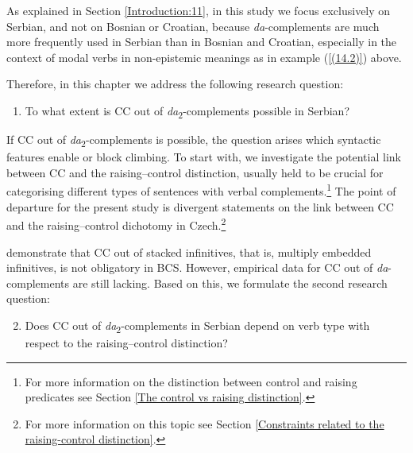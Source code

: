 As explained in Section \ref{Introduction:11}, in this study we focus exclusively on Serbian, and not on Bosnian or Croatian, because \textit{da}-complements are much more frequently used in Serbian than in Bosnian and Croatian, especially in the context of modal verbs in non-epistemic meanings as in example (\ref{(14.2)}) above.

Therefore, in this chapter we address the following research question: 

\begin{enumerate}[label=Q\arabic*:]
\item To what extent is CC out of \textit{da}\textsubscript{2}-complements possible in Serbian?
\end{enumerate}

If CC out of \textit{da}\textsubscript{2}-complements is possible, the question arises which syntactic features enable or block climbing. To start with, we investigate the potential link between CC and the raising--control distinction, usually held to be crucial for categorising different types of sentences with verbal complements.\footnote{For more information on the distinction between control and raising predicates see Section \ref{The control vs raising distinction}.} The point of departure for the present study is divergent statements on the link between CC and the raising--control dichotomy in Czech.\footnote{For more information on this topic see Section \ref{Constraints related to the raising-control distinction}.} 

\citet*{HKJ18} demonstrate that CC out of stacked infinitives, that is, multiply embedded infinitives, is not obligatory in BCS. However, empirical data for CC out of \textit{da}-complements are still lacking. Based on this, we formulate the second research question:

\begin{enumerate}[label=Q\arabic*:]
\setcounter{enumi}{1}
\item Does CC out of \textit{da}\textsubscript{2}-complements in Serbian depend on verb type with respect to the raising--control distinction?
\end{enumerate}

